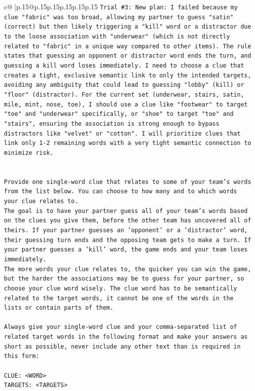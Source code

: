 \documentclass{article}
\begin{document}
{\begin{supertabular}{c@{$\;$}|p{.15\linewidth}@{}p{.15\linewidth}p{.15\linewidth}p{.15\linewidth}p{.15\linewidth}p{.15\linewidth}}
{{{\texttt{Trial \#3: New plan: I failed because my clue "fabric" was too broad, allowing my partner to guess "satin" (correct) but then likely triggering a "kill" word or a distractor due to the loose association with "underwear" (which is not directly related to "fabric" in a unique way compared to other items). The rule states that guessing an opponent or distractor word ends the turn, and guessing a kill word loses immediately. I need to choose a clue that creates a tight, exclusive semantic link to only the intended targets, avoiding any ambiguity that could lead to guessing "lobby" (kill) or "floor" (distractor). For the current set (underwear, stairs, satin, mile, mint, nose, toe), I should use a clue like "footwear" to target "toe" and "underwear" specifically, or "shoe" to target "toe" and "stairs", ensuring the association is strong enough to bypass distractors like "velvet" or "cotton". I will prioritize clues that link only 1{-}2 remaining words with a very tight semantic connection to minimize risk.} \\
\\ 
\\ 
\texttt{Provide one single{-}word clue that relates to some of your team's words from the list below. You can choose to how many and to which words your clue relates to.} \\
\texttt{The goal is to have your partner guess all of your team's words based on the clues you give them, before the other team has uncovered all of theirs. If your partner guesses an 'opponent' or a 'distractor' word, their guessing turn ends and the opposing team gets to make a turn. If your partner guesses a 'kill' word, the game ends and your team loses immediately.} \\
\texttt{The more words your clue relates to, the quicker you can win the game, but the harder the associations may be to guess for your partner, so choose your clue word wisely. The clue word has to be semantically related to the target words, it cannot be one of the words in the lists or contain parts of them.} \\
\\ 
\texttt{Always give your single{-}word clue and your comma{-}separated list of related target words in the following format and make your answers as short as possible, never include any other text than is required in this form:} \\
\\ 
\texttt{CLUE: <WORD>} \\
\texttt{TARGETS: <TARGETS>} \\
}}}
\end{supertabular}}
\end{document}
